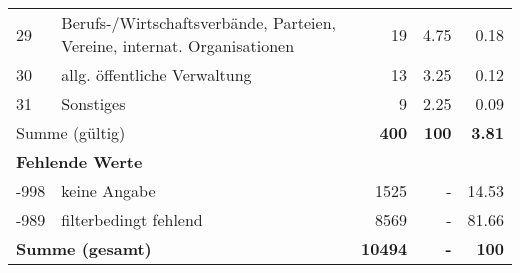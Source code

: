 \begin{longtable}{lXrrr}
        29 & \multicolumn{1}{X}{Berufs-/Wirtschaftsverbände, Parteien, Vereine, internat. Organisationen} & %
          \num{19} &
          \num[round-mode=places,round-precision=2]{4.75} &
          \num[round-mode=places,round-precision=2]{0.18} \\

        30 & \multicolumn{1}{X}{allg. öffentliche Verwaltung} & %
          \num{13} &
          \num[round-mode=places,round-precision=2]{3.25} &
          \num[round-mode=places,round-precision=2]{0.12} \\

        31 & \multicolumn{1}{X}{Sonstiges} & %
          \num{9} &
          \num[round-mode=places,round-precision=2]{2.25} &
          \num[round-mode=places,round-precision=2]{0.09} \\

     \midrule
     \multicolumn{2}{l}{Summe (gültig)} &
       \textbf{\num{400}} &
     \textbf{\num{100}} &
       \textbf{\num[round-mode=places,round-precision=2]{3.81}} \\
     \multicolumn{5}{l}{\textbf{Fehlende Werte}}\\
       -998 &
       keine Angabe &
         \num{1525} &
        - &
         \num[round-mode=places,round-precision=2]{14.53} \\
       -989 &
       filterbedingt fehlend &
         \num{8569} &
        - &
         \num[round-mode=places,round-precision=2]{81.66} \\
     \midrule
     \multicolumn{2}{l}{\textbf{Summe (gesamt)}} &
          \textbf{\num{10494}} &
        \textbf{-} &
        \textbf{\num{100}} \\
     \bottomrule
     \end{longtable}
     
